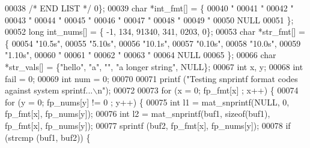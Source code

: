 \begin{DoxyCode}
{{{{{{{{{{{{{{00038                              \textcolor{comment}{/* END LIST */} 0\};
00039         \textcolor{keywordtype}{char} *int\_fmt[] = \{
00040                 \textcolor{stringliteral}{"%
00041                 \textcolor{stringliteral}{"%
00042                 \textcolor{stringliteral}{"%
00043                 \textcolor{stringliteral}{"%
00044                 \textcolor{stringliteral}{"%
00045                 \textcolor{stringliteral}{"%
00046                 \textcolor{stringliteral}{"%
00047                 \textcolor{stringliteral}{"%
00048                 \textcolor{stringliteral}{"%
00049                 \textcolor{stringliteral}{"%
00050                 NULL
00051         \};
00052         \textcolor{keywordtype}{long} int\_nums[] = \{ -1, 134, 91340, 341, 0203, 0\};
00053         \textcolor{keywordtype}{char} *str\_fmt[] = \{
00054                 \textcolor{stringliteral}{"10.5s"},
00055                 \textcolor{stringliteral}{"5.10s"},
00056                 \textcolor{stringliteral}{"10.1s"},
00057                 \textcolor{stringliteral}{"0.10s"},
00058                 \textcolor{stringliteral}{"10.0s"},
00059                 \textcolor{stringliteral}{"1.10s"},
00060                 \textcolor{stringliteral}{"%
00061                 \textcolor{stringliteral}{"%
00062                 \textcolor{stringliteral}{"%
00063                 \textcolor{stringliteral}{"%
00064                 NULL
00065         \};
00066         \textcolor{keywordtype}{char} *str\_vals[] = \{\textcolor{stringliteral}{"hello"}, \textcolor{stringliteral}{"a"}, \textcolor{stringliteral}{""}, \textcolor{stringliteral}{"a longer string"}, NULL\};
00067         \textcolor{keywordtype}{int} x, y;
00068         \textcolor{keywordtype}{int} fail = 0;
00069         \textcolor{keywordtype}{int} num = 0;
00070 
00071         printf (\textcolor{stringliteral}{"Testing snprintf format codes against system sprintf...\(\backslash\)n"});
00072 
00073         \textcolor{keywordflow}{for} (x = 0; fp\_fmt[x] ; x++) \{
00074                 \textcolor{keywordflow}{for} (y = 0; fp\_nums[y] != 0 ; y++) \{
00075                         \textcolor{keywordtype}{int} l1 = mat\_snprintf(NULL, 0, fp\_fmt[x], fp\_nums[y]);
00076                         \textcolor{keywordtype}{int} l2 = mat\_snprintf(buf1, \textcolor{keyword}{sizeof}(buf1), fp\_fmt[x], fp\_nums[y]);
00077                         sprintf (buf2, fp\_fmt[x], fp\_nums[y]);
00078                         \textcolor{keywordflow}{if} (strcmp (buf1, buf2)) \{
}}}}}}}}}}}}}}}}}}}}}}}}}}}}
\end{DoxyCode}
